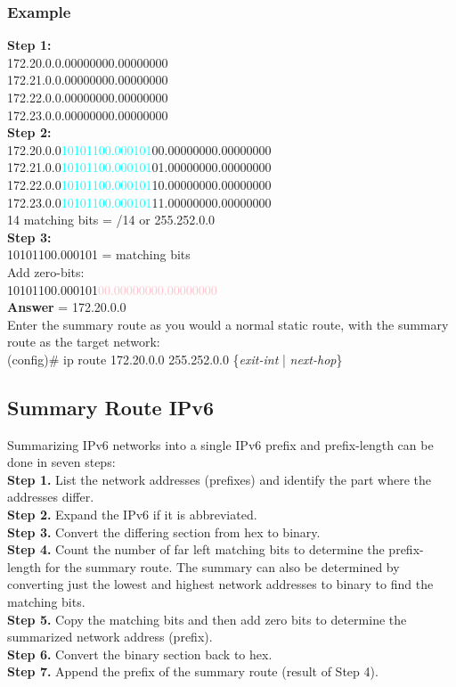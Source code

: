 \subsubsection*{Example}
\textrm{\textbf{Step 1:}}\\
172.20.0.0.00000000.00000000\\
172.21.0.0.00000000.00000000\\
172.22.0.0.00000000.00000000\\
172.23.0.0.00000000.00000000\\
\textrm{\textbf{Step 2:}}\\
172.20.0.0\qquad \textcolor{cyan}{10101100.000101}00.00000000.00000000\\
172.21.0.0\qquad \textcolor{cyan}{10101100.000101}01.00000000.00000000\\
172.22.0.0\qquad \textcolor{cyan}{10101100.000101}10.00000000.00000000\\
172.23.0.0\qquad \textcolor{cyan}{10101100.000101}11.00000000.00000000\\
\textrm{14 matching bits = /14 or 255.252.0.0\\\textbf{Step 3:}}\\
10101100.000101 \textrm{= matching bits\\Add zero-bits:}\\
10101100.000101\textcolor{pink}{00.00000000.00000000}\\
\textrm{\textbf{Answer} = 172.20.0.0\\Enter the summary route as you would a normal static route, with the summary route as the target network:}\\
(config)\# ip route 172.20.0.0 255.252.0.0 \{\textit{exit-int} | \textit{next-hop}\}

\subsection{Summary Route IPv6}
\textrm{Summarizing IPv6 networks into a single IPv6 prefix and prefix-length can be done in seven steps:\\
\textbf{Step 1.} List the network addresses (prefixes) and identify the part where the addresses differ.\\
\textbf{Step 2.} Expand the IPv6 if it is abbreviated.\\
\textbf{Step 3.} Convert the differing section from hex to binary.\\
\textbf{Step 4.} Count the number of far left matching bits to determine the prefix-length for the summary route. The summary can also be determined by converting just the lowest and highest network addresses to binary to find the matching bits.\\
\textbf{Step 5.} Copy the matching bits and then add zero bits to determine the summarized network address (prefix).\\
\textbf{Step 6.} Convert the binary section back to hex.\\
\textbf{Step 7.} Append the prefix of the summary route (result of Step 4).
}

